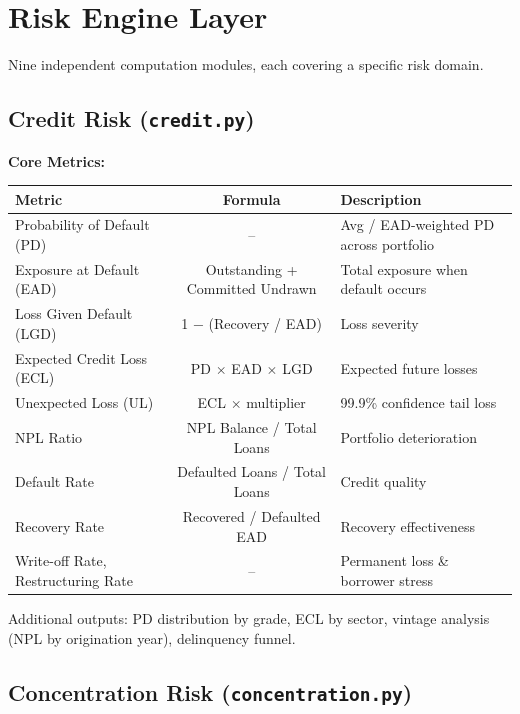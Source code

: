 \documentclass[12pt,a4paper]{article}
\begin{document}
\section{Risk Engine Layer}

Nine independent computation modules, each covering a specific risk domain.

\subsection{Credit Risk (\texttt{credit.py})}

\textbf{Core Metrics:}
\begin{center}
\begin{tabular}{|l|c|l|}
\hline
\textbf{Metric} & \textbf{Formula} & \textbf{Description} \\
\hline
Probability of Default (PD) & -- & Avg / EAD-weighted PD across portfolio \\
Exposure at Default (EAD) & Outstanding + Committed Undrawn & Total exposure when default occurs \\
Loss Given Default (LGD) & 1 − (Recovery / EAD) & Loss severity \\
Expected Credit Loss (ECL) & PD $\times$ EAD $\times$ LGD & Expected future losses \\
Unexpected Loss (UL) & ECL $\times$ multiplier & 99.9\% confidence tail loss \\
NPL Ratio & NPL Balance / Total Loans & Portfolio deterioration \\
Default Rate & Defaulted Loans / Total Loans & Credit quality \\
Recovery Rate & Recovered / Defaulted EAD & Recovery effectiveness \\
Write-off Rate, Restructuring Rate & -- & Permanent loss \& borrower stress \\
\hline
\end{tabular}
\end{center}

Additional outputs: PD distribution by grade, ECL by sector, vintage analysis (NPL by origination year), delinquency funnel.

\subsection{Concentration Risk (\texttt{concentration.py})}
\end{document}
